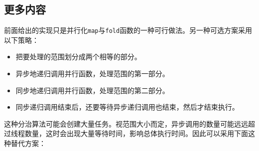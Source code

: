 



\subsection{更多内容}



前面给出的实现只是并行化\texttt{map}与\texttt{fold}函数的一种可行做法。另一种可选方案采用以下策略：



\begin{itemize}
\item 把要处理的范围划分成两个相等的部分。



\item 异步地递归调用并行函数，处理范围的第一部分。



\item 同步地递归调用并行函数，处理范围的第二部分。



\item 同步递归调用结束后，还要等待异步递归调用也结束，然后才结束执行。

\end{itemize}



这种分治算法可能会创建大量任务。视范围大小而定，异步调用的数量可能远远超过线程数量，这时会出现大量等待时间，影响总体执行时间。因此可以采用下面这种替代方案：



